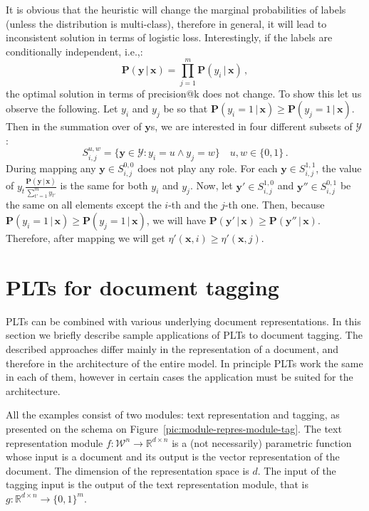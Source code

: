 \documentclass{article}
\renewcommand{\vec}[1]{\boldsymbol{#1}}
\newcommand{\bx}{\vec{x}}
\newcommand{\by}{\vec{y}}
\newcommand{\calY}{\mathcal{Y}}
\newcommand{\calW}{\mathcal{W}}
\newcommand\R{\mathbb{R}}   %
\newcommand{\prob}{\mathbf{P}}
\newcommand{\given}{\, | \,}
\newcommand{\sectionBefore}{-0pt}
\newcommand{\sectionAfter}{-0pt}
\begin{document}
It is obvious that the heuristic will change the marginal probabilities of labels (unless the distribution is multi-class), therefore in general, it will lead to inconsistent solution in terms of logistic loss. 
Interestingly, if the labels are conditionally independent, i.e.,:
$$
\prob(\by \given \bx) = \prod_{j=1}^m \prob(y_i \given \bx)\,,
$$
the optimal solution in terms of precision@k does not change. To show this let us observe the following.
Let $y_i$ and $y_j$ be so that $\prob(y_i = 1 \given \bx) \ge \prob(y_j = 1 \given \bx) $. Then in the summation over of $\by$s, we are interested in four different subsets of $\calY$: 
$$
S_{i,j}^{u,w}  =  \{\by\in \calY: y_i = u \land y_j = w\} \quad u,w \in \{0,1\} \,.
$$
During mapping any $\by \in S^{0,0}_{i,j}$ does not play any role. For each $\by \in S^{1,1}_{i,j}$, the value of $y_t \frac{\prob(\by \given \bx)}{\sum_{t'=1}^m y_{t'}}$ is the same for both $y_i$ and $y_j$. Now, let $\by' \in S^{1,0}_{i,j}$ and $\by'' \in S^{0,1}_{i,j}$ be the same on all elements except the $i$-th and the $j$-th one. Then, because   $\prob(y_i = 1 \given \bx) \ge \prob(y_j = 1 \given \bx) $, we will have $\prob(\by' \given \bx) \ge \prob(\by'' \given \bx)$. Therefore, after mapping we will get $\eta'(\bx,i) \ge \eta'(\bx, j)$. 


%
%
%




\vspace{\sectionBefore}
\section{PLTs for document tagging}
\label{sec:tagging_PLTs}
\vspace{\sectionAfter}


PLTs can be combined with various underlying document representations. In this section we briefly describe sample applications of PLTs to document tagging. 
The described approaches differ mainly in the representation of a document, and therefore in the architecture of the entire model. In principle PLTs work the same in each of them, however in certain cases the application must be suited for the architecture.

All the examples consist of two modules: text representation and tagging, as presented on the schema on Figure~\ref{pic:module-repres-module-tag}. The text representation module $f : \calW^{n} \rightarrow \R^{d \times n}$ is a (not necessarily) parametric function whose input is a document and its output is the vector representation of the document. The dimension of the representation space is $d$. 
The input of the tagging input is the output of the text representation module, that is $g: \R^{d \times n} \rightarrow  \{ 0 , 1 \}^m$. 
\end{document}
